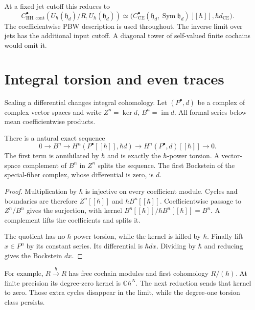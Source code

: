 At a fixed jet cutoff this reduces to
\[
 C^\bullet_{\mathrm{HH,cont}}
       (U_\hbar(\mathfrak h_d)/R,U_\hbar(\mathfrak h_d))
 \simeq
 \bigl(C^\bullet_{\mathrm{CE}}
   (\mathfrak h_d,\operatorname{Sym}\mathfrak h_d)[[\hbar]],
                                             \hbar d_{\mathrm{CE}}\bigr).
\]
The coefficientwise PBW description is used throughout.
The inverse limit over jets has the additional input cutoff.
A diagonal tower of self-valued finite cochains would omit it.

\section{Integral torsion and even traces}

Scaling a differential changes integral cohomology.
Let $(P^\bullet,d)$ be a complex of complex vector spaces and
write $Z^n=\ker d$, $B^n=\operatorname{im}d$.
All formal series below mean coefficientwise products.

\begin{proposition}\label{mht:prop:scaled-ce-torsion}
There is a natural exact sequence
\[
 0\longrightarrow B^n
 \longrightarrow H^n(P^\bullet[[\hbar]],\hbar d)
 \longrightarrow H^n(P^\bullet,d)[[\hbar]]
 \longrightarrow0.
\]
The first term is annihilated by $\hbar$ and is exactly the
$\hbar$-power torsion. A vector-space complement of $B^n$ in
$Z^n$ splits the sequence. The first Bockstein of the
special-fiber complex, whose differential is zero, is $d$.
\end{proposition}

\begin{proof}
Multiplication by $\hbar$ is injective on every coefficient
module. Cycles and boundaries are therefore
$Z^n[[\hbar]]$ and $\hbar B^n[[\hbar]]$.
Coefficientwise passage to $Z^n/B^n$ gives the surjection, with
kernel $B^n[[\hbar]]/\hbar B^n[[\hbar]]=B^n$.
A complement lifts the coefficients and splits it.

The quotient has no $\hbar$-power torsion, while the kernel is
killed by $\hbar$. Finally lift $x\in P^n$ by its constant series.
Its differential is $\hbar dx$. Dividing by $\hbar$ and reducing
gives the Bockstein $dx$.
\end{proof}

For example, $R\xrightarrow{\hbar}R$ has free cochain modules and
first cohomology $R/(\hbar)$. At finite precision its degree-zero
kernel is $\mathbb C\hbar^N$. The next reduction sends that
kernel to zero. Those extra cycles disappear in the limit,
while the degree-one torsion class persists.

